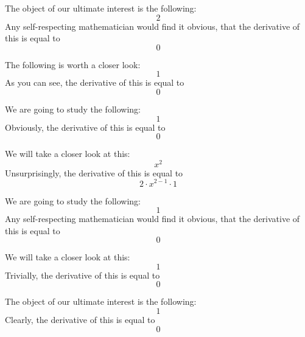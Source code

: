 \documentclass{article}
\begin{document}
The object of our ultimate interest is the following:
\begin{equation}
2 
\end{equation}
Any self-respecting mathematician would find it obvious, that the derivative of this is equal to
\begin{equation}
0 
\end{equation}

The following is worth a closer look:
\begin{equation}
1 
\end{equation}
As you can see, the derivative of this is equal to
\begin{equation}
0 
\end{equation}

We are going to study the following:
\begin{equation}
1 
\end{equation}
Obviously, the derivative of this is equal to
\begin{equation}
0 
\end{equation}

We will take a closer look at this:
\begin{equation}
x ^{2 } 
\end{equation}
Unsurprisingly, the derivative of this is equal to
\begin{equation}
2 \cdot x ^{2 - 1 } \cdot 1 
\end{equation}

We are going to study the following:
\begin{equation}
1 
\end{equation}
Any self-respecting mathematician would find it obvious, that the derivative of this is equal to
\begin{equation}
0 
\end{equation}

We will take a closer look at this:
\begin{equation}
1 
\end{equation}
Trivially, the derivative of this is equal to
\begin{equation}
0 
\end{equation}

The object of our ultimate interest is the following:
\begin{equation}
1 
\end{equation}
Clearly, the derivative of this is equal to
\begin{equation}
0 
\end{equation}
\end{document}
